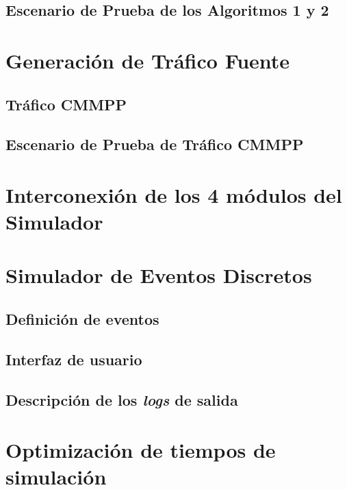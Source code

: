 \subsection{Escenario de Prueba de los Algoritmos 1 y 2}


\section{Generación de Tráfico Fuente}

\subsection{Tráfico CMMPP}
\subsection{Escenario de Prueba de Tráfico CMMPP}


\section{Interconexión de los 4 módulos del Simulador}


\section{Simulador de Eventos Discretos}

\subsection{Definición de eventos}

\subsection{Interfaz de usuario}

\subsection{Descripción de los \textit{logs} de salida}


\section{Optimización de tiempos de simulación}

